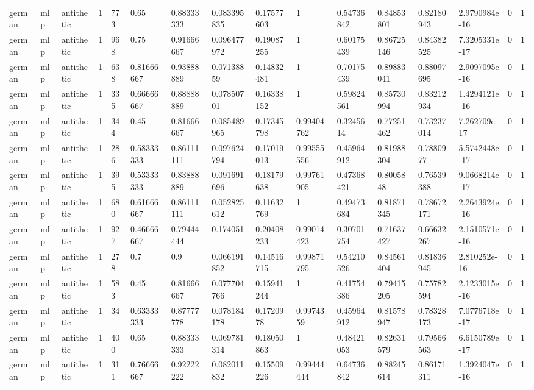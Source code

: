 \begin{tabular}{llllllllllllllll}
german & mlp & antithetic & 1 & 773 & 0.65 & 0.88333333 & 0.083395835 & 0.17577603 & 1 & 0.54736842 & 0.84853801 & 0.82180943 & 2.9790984e-16 & 0 & 1 \\
german & mlp & antithetic & 1 & 968 & 0.75 & 0.91666667 & 0.096477972 & 0.19087255 & 1 & 0.60175439 & 0.86725146 & 0.84382525 & 7.3205331e-17 & 0 & 1 \\
german & mlp & antithetic & 1 & 638 & 0.81666667 & 0.93888889 & 0.07138859 & 0.14832481 & 1 & 0.70175439 & 0.89883041 & 0.88097695 & 2.9097095e-16 & 0 & 1 \\
german & mlp & antithetic & 1 & 335 & 0.66666667 & 0.88888889 & 0.07850701 & 0.16338152 & 1 & 0.59824561 & 0.85730994 & 0.83212934 & 1.4294121e-16 & 0 & 1 \\
german & mlp & antithetic & 1 & 344 & 0.45 & 0.81666667 & 0.085489965 & 0.17345798 & 0.99404762 & 0.3245614 & 0.77251462 & 0.73237014 & 7.262709e-17 & 0 & 1 \\
german & mlp & antithetic & 1 & 286 & 0.58333333 & 0.86111111 & 0.097624794 & 0.17019013 & 0.99555556 & 0.45964912 & 0.81988304 & 0.7880977 & 5.5742448e-17 & 0 & 1 \\
german & mlp & antithetic & 1 & 395 & 0.53333333 & 0.83888889 & 0.091691696 & 0.18179638 & 0.99761905 & 0.47368421 & 0.8005848 & 0.76539388 & 9.0668214e-17 & 0 & 1 \\
german & mlp & antithetic & 1 & 680 & 0.61666667 & 0.86111111 & 0.052825612 & 0.11632769 & 1 & 0.49473684 & 0.81871345 & 0.78672171 & 2.2643924e-16 & 0 & 1 \\
german & mlp & antithetic & 1 & 927 & 0.46666667 & 0.79444444 & 0.174051 & 0.20408233 & 0.99014423 & 0.30701754 & 0.71637427 & 0.66632267 & 2.1510571e-16 & 0 & 1 \\
german & mlp & antithetic & 1 & 278 & 0.7 & 0.9 & 0.066191852 & 0.14516715 & 0.99871795 & 0.54210526 & 0.84561404 & 0.81836945 & 2.810252e-16 & 0 & 1 \\
german & mlp & antithetic & 1 & 583 & 0.45 & 0.81666667 & 0.077704766 & 0.15941244 & 1 & 0.41754386 & 0.79415205 & 0.75782594 & 2.1233015e-16 & 0 & 1 \\
german & mlp & antithetic & 1 & 34 & 0.63333333 & 0.87777778 & 0.078184178 & 0.1720978 & 0.9974359 & 0.45964912 & 0.81578947 & 0.78328173 & 7.0776718e-17 & 0 & 1 \\
german & mlp & antithetic & 1 & 400 & 0.65 & 0.88333333 & 0.069781314 & 0.18050863 & 1 & 0.48421053 & 0.82631579 & 0.79566563 & 6.6150789e-17 & 0 & 1 \\
german & mlp & antithetic & 1 & 311 & 0.76666667 & 0.92222222 & 0.082011832 & 0.15509226 & 0.99444444 & 0.64736842 & 0.88245614 & 0.86171311 & 1.3924047e-16 & 0 & 1 \\

\end{tabular}
